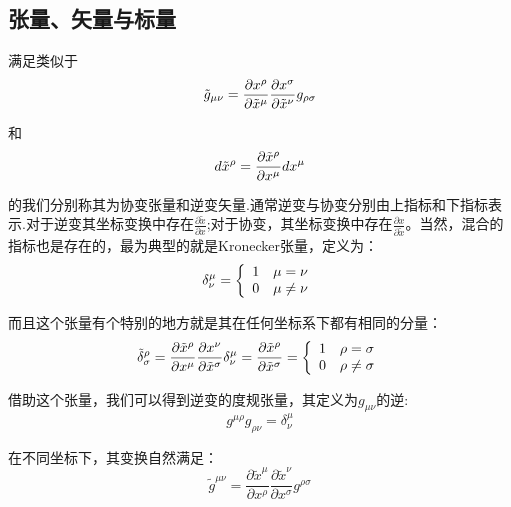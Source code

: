 \documentclass[a4paper]{book}
\begin{document}
\begin{appendix}
\section{张量、矢量与标量}
满足类似于
\begin{equation}
	 \tilde{g}_{\mu\nu}=\frac{\partial x^{\rho}}{\partial\tilde{x}^{\mu}}\frac{\partial x^{\sigma}}{\partial \tilde{x}^{\nu}} g_{\rho\sigma}  \notag
\end{equation}\par 
和
\begin{equation}
	d\tilde{x}^{\rho}=\frac{\partial \tilde{x}^{\rho}}{\partial x^{\mu}} dx^{\mu} \notag
\end{equation}\par
的我们分别称其为协变张量和逆变矢量.通常逆变与协变分别由上指标和下指标表示.对于逆变其坐标变换中存在$\frac{\partial \tilde{x}}{\partial x}$;对于协变，其坐标变换中存在$\frac{\partial {x}}{\partial \tilde{x}}$。当然，混合的指标也是存在的，最为典型的就是Kronecker张量，定义为：
\begin{equation}
	\delta^{\mu}_{\nu}=\left\{\begin{array}{l l}{{1}}&{{ \mu=\nu}}\\ {{0}}&{{ \mu\not=\nu}}\end{array}\right.
\end{equation}\par
而且这个张量有个特别的地方就是其在任何坐标系下都有相同的分量：
\begin{equation}
	\tilde{\delta}^{\rho}_{\sigma}=\frac{\partial \tilde{x}^{\rho}}{\partial x^{\mu}}\frac{\partial x^{\nu}}{\partial \tilde{x}^{\sigma}}	\delta^{\mu}_{\nu}=\frac{\partial \tilde{x}^\rho}{\partial \tilde{x}^\sigma}=\left\{\begin{array}{l l}{{1}}&{{ \rho=\sigma}}\\ {{0}}&{{ \rho\not=\sigma}}\end{array}\right. \notag
\end{equation}\par 
借助这个张量，我们可以得到逆变的度规张量，其定义为$g_{\mu \nu}$的逆:
\begin{equation}
	g^{\mu \rho}g_{\rho \nu}=\delta^{\mu}_{\nu}
\end{equation}\par 
在不同坐标下，其变换自然满足：
\begin{equation}
	\tilde{g}^{\mu\nu}=\frac{\partial \tilde{x}^{\mu}}{\partial x^{\rho}}\frac{\partial \tilde{x}^{\nu}}{\partial x^{\sigma}} g^{\rho\sigma}  
\end{equation}\par

\end{appendix}
\end{document}
